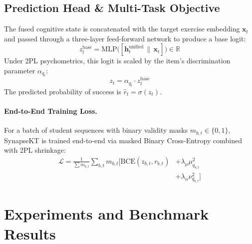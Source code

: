 \documentclass[11pt]{article}
\begin{document}
\subsection{Prediction Head \& Multi-Task Objective}
\label{sec:objective}

The fused cognitive state is concatenated with the target exercise embedding $\mathbf{x}_t$ and passed through a three-layer feed-forward network to produce a base logit:
\begin{equation}
z_t^{\text{base}} = \text{MLP}\big( [\mathbf{h}_t^{\text{unified}} \,\|\, \mathbf{x}_t] \big) \in \mathbb{R}
\end{equation}
Under 2PL psychometrics, this logit is scaled by the item's discrimination parameter $\alpha_{q_t}$:
\begin{equation}
z_t = \alpha_{q_t} \cdot z_t^{\text{base}}
\end{equation}
The predicted probability of success is $\hat{r}_t = \sigma(z_t)$.

\paragraph{End-to-End Training Loss.}
For a batch of student sequences with binary validity masks $m_{b, t} \in \{0, 1\}$, SynapseKT is trained end-to-end via masked Binary Cross-Entropy combined with 2PL shrinkage:
\begin{equation}
\begin{split}
\mathcal{L} = \frac{1}{\sum m_{b, t}} \sum_{b, t} m_{b, t} \Big[ \text{BCE}(z_{b, t}, r_{b, t}) &+ \lambda_\mu \mu_{q_{b, t}}^2 \\
&+ \lambda_\alpha \nu_{q_{b, t}}^2 \Big]
\end{split}
\end{equation}

\section{Experiments and Benchmark Results}
\label{sec:experiments}
\end{document}
